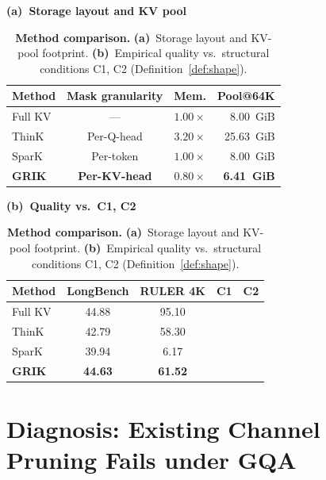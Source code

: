 \documentclass{article}
\newcommand{\cmark}{\ding{51}}%
\newcommand{\xmark}{\ding{55}}
\begin{document}
\begin{table}[t!]
\centering
\small
\caption{\textbf{Method comparison.} \textbf{(a)}~Storage layout and KV-pool footprint. \textbf{(b)}~Empirical quality vs.\ structural conditions C1, C2 (Definition~\ref{def:shape}).}
\label{tab:design-and-diagnosis}
 
\begin{minipage}[t]{0.50\textwidth}
\centering
\textbf{(a)~Storage layout and KV pool}\label{tab:design-axes-with-mem}\\[3pt]
\setlength{\tabcolsep}{4pt}
\begin{tabular}{@{}lcrr@{}}
\toprule
Method & Mask granularity & Mem. & Pool@64K \\
\midrule
Full KV     & ---             & $1.00\times$ &  8.00~GiB \\
ThinK       & Per-Q-head      & $3.20\times$ & \textcolor{red!70!black}{25.63~GiB} \\
SparK       & Per-token       & $1.00\times$ &  8.00~GiB \\
\textbf{GRIK} & \textbf{Per-KV-head} & $\mathbf{0.80\times}$ & \textbf{6.41~GiB} \\
\bottomrule
\end{tabular}
\end{minipage}%
\hfill
\begin{minipage}[t]{0.46\textwidth}
\centering
\textbf{(b)~Quality vs.\ C1, C2}\label{tab:diagnosis}\\[3pt]
\setlength{\tabcolsep}{4pt}
\renewcommand{\arraystretch}{1.10}
\begin{tabular}{@{}lcccc@{}}
\toprule
Method & LongBench & RULER 4K & C1 & C2 \\
\midrule
Full KV       & 44.88           & 95.10           & \cmark & \cmark \\
ThinK         & 42.79           & 58.30           & \xmark & \cmark \\
SparK         & 39.94           &  6.17           & \cmark & \xmark \\
\textbf{GRIK} & \textbf{44.63}  & \textbf{61.52}  & \cmark & \cmark \\
\bottomrule
\end{tabular}
\end{minipage}
\end{table}
\section{Diagnosis: Existing Channel Pruning Fails under GQA}
\label{sec:diagnosis}
\label{sec:analysis}
 
\end{document}
